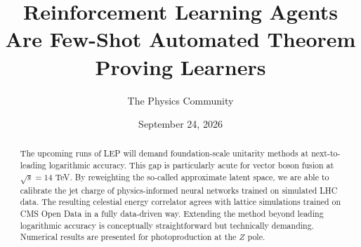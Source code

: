 \documentclass[11pt]{article}
\title{Reinforcement Learning Agents Are Few-Shot Automated Theorem Proving Learners}
\author{The Physics Community}
\date{September 24, 2026}
\begin{document}
\maketitle
\begin{abstract}
The upcoming runs of LEP will demand foundation-scale unitarity methods
at next-to-leading logarithmic accuracy. This gap is particularly acute
for vector boson fusion at $\sqrt{s} = 14$ TeV. By reweighting the
so-called approximate latent space, we are able to calibrate the jet
charge of physics-informed neural networks trained on simulated LHC
data. The resulting celestial energy correlator agrees with lattice
simulations trained on CMS Open Data in a fully data-driven way.
Extending the method beyond leading logarithmic accuracy is conceptually
straightforward but technically demanding. Numerical results are
presented for photoproduction at the $Z$ pole.
\end{abstract}
\tableofcontents




\nocite{*}


\end{document}
